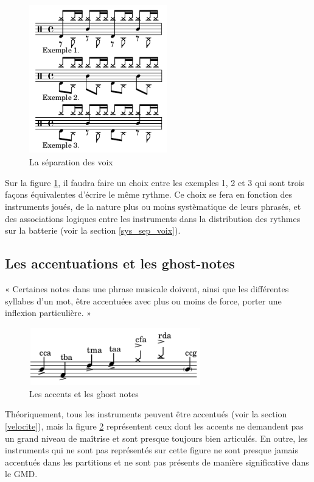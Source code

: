 \begin{figure}[h]
	\centering
	\includegraphics[height=65mm, width=60mm]{
    z_images/3_methodes/0_notation_de_la_batterie/7_voix.png}
	\caption{La séparation des voix}
	\label{sep_voix}
\end{figure}
Sur la figure \ref{sep_voix}, il faudra faire un choix entre les exemples 1, 2
et 3 qui sont trois façons équivalentes d’écrire le même rythme.
Ce choix se fera en fonction des instruments joués, de la nature plus ou moins
systèmatique de leurs phrasés, et des associations logiques entre les
instruments dans la distribution des rythmes sur la batterie (voir la section
\ref{sys_sep_voix}).

\subsection*{Les accentuations et les ghost-notes}
« Certaines notes dans une phrase musicale doivent, ainsi que les différentes
syllabes d’un mot, être accentuées avec plus ou moins de force, porter une
inflexion particulière. » \cite{danhauser}
\begin{figure}[h]
\centering
\includegraphics[height=25mm, width=75mm]{
z_images/3_methodes/0_notation_de_la_batterie/8_accents_et_ghost-notes_0.png}
\caption{Les accents et les ghost notes}
\label{accents_et_gn}
\end{figure}

Théoriquement, tous les instruments peuvent être accentués (voir la section
\ref{velocite}), mais la figure \ref{accents_et_gn} représentent ceux dont les
accents ne demandent pas un grand niveau de maîtrise et sont presque toujours
bien articulés. En outre, les instruments qui ne sont pas représentés sur cette
figure ne sont presque jamais accentués dans les partitions et ne sont pas
présents de manière significative dans le GMD.

